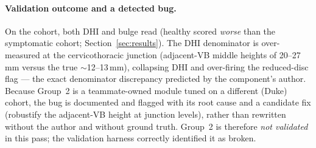 \paragraph{Validation outcome and a detected bug.} On the cohort, both DHI and bulge read
 (healthy scored \emph{worse} than the symptomatic cohort; Section~\ref{sec:results}). The
DHI denominator is over-measured at the cervicothoracic junction (adjacent-VB middle heights of
20--27\,mm versus the true $\sim$12--13\,mm), collapsing DHI and over-firing the reduced-disc flag --- the
exact denominator discrepancy predicted by the component's author. Because Group~2 is a teammate-owned
module tuned on a different (Duke) cohort, the bug is documented and flagged with its root cause and a
candidate fix (robustify the adjacent-VB height at junction levels), rather than rewritten without the
author and without ground truth. Group~2 is therefore \emph{not validated} in this pass; the validation
harness correctly identified it as broken.
